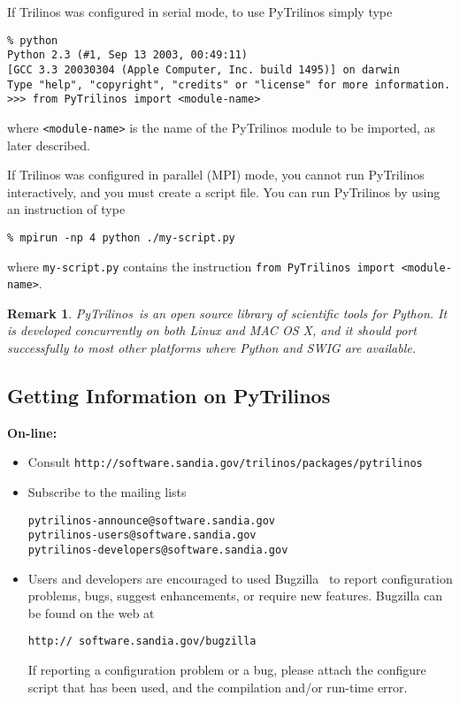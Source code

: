 \documentclass[10pt,relax]{SANDreport}
\newcommand{\PyTrilinos}{{PyTrilinos}}
\newtheorem{remark}{Remark}
\begin{document}
If Trilinos was configured in serial mode, to use PyTrilinos  simply type
\begin{verbatim}
% python
Python 2.3 (#1, Sep 13 2003, 00:49:11) 
[GCC 3.3 20030304 (Apple Computer, Inc. build 1495)] on darwin
Type "help", "copyright", "credits" or "license" for more information.
>>> from PyTrilinos import <module-name>
\end{verbatim}
where \verb!<module-name>! is the name of the PyTrilinos module to be
imported, as later described.

If Trilinos was configured in parallel (MPI) mode, you cannot run PyTrilinos
interactively, and you must create a script file. You can run PyTrilinos by
using an instruction of type
\begin{verbatim}
% mpirun -np 4 python ./my-script.py
\end{verbatim}
where \verb!my-script.py! contains the instruction \verb!from PyTrilinos import <module-name>!.

\begin{remark}
\PyTrilinos\ is an open source library of scientific tools for Python.
It is developed concurrently on both Linux and MAC OS X, and it should
port successfully to most other platforms where Python and SWIG are available.
\end{remark}

\subsection{Getting Information on \PyTrilinos}
\label{sec:getting}

{\bf On-line:}
\begin{itemize}
\item Consult \verb!http://software.sandia.gov/trilinos/packages/pytrilinos!
\item Subscribe to the mailing lists
\begin{verbatim}
pytrilinos-announce@software.sandia.gov
pytrilinos-users@software.sandia.gov
pytrilinos-developers@software.sandia.gov
\end{verbatim}
\item Users and developers are encouraged to used Bugzilla~\cite{bugzilla} to report
configuration problems, bugs, suggest enhancements, or require new features.
Bugzilla can be found on the web at
\begin{verbatim}
http:// software.sandia.gov/bugzilla
\end{verbatim}
If reporting a configuration problem or a bug, please attach the configure
script that has been used, and the compilation and/or run-time error.
\end{itemize}
\end{document}
